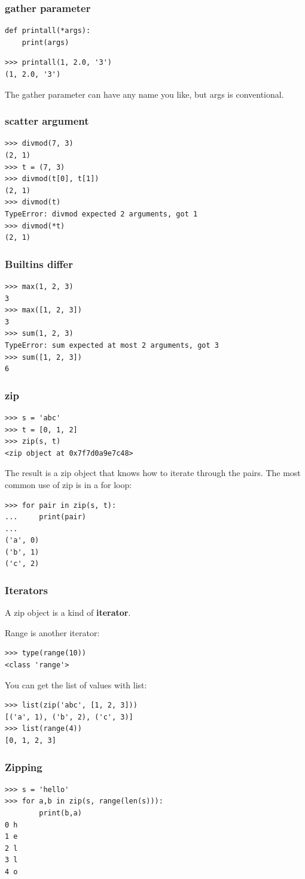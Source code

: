 \documentclass{beamer}
\newcommand{\bfr}[1]{\begin{frame}[fragile]\frametitle{{ #1 }}}
\begin{document}
\bfr{gather parameter}

\begin{lstlisting}
def printall(*args):
    print(args)
\end{lstlisting}
\begin{lstlisting}
>>> printall(1, 2.0, '3')
(1, 2.0, '3')
\end{lstlisting}
The gather parameter can have any name you like, but args is conventional. 
\end{frame}

\bfr{scatter argument}
\begin{lstlisting}
>>> divmod(7, 3)
(2, 1)
>>> t = (7, 3)
>>> divmod(t[0], t[1])
(2, 1)
>>> divmod(t)
TypeError: divmod expected 2 arguments, got 1
>>> divmod(*t)
(2, 1)
\end{lstlisting}
\end{frame}

\bfr{Builtins differ}
\begin{lstlisting}
>>> max(1, 2, 3)
3
>>> max([1, 2, 3])
3
>>> sum(1, 2, 3)
TypeError: sum expected at most 2 arguments, got 3
>>> sum([1, 2, 3])
6
\end{lstlisting}
\end{frame}

\bfr{zip}
\begin{lstlisting}
>>> s = 'abc'
>>> t = [0, 1, 2]
>>> zip(s, t)
<zip object at 0x7f7d0a9e7c48>
\end{lstlisting}
The result is a zip object that knows how to iterate through the pairs. The most common use of zip is in a for loop:
\begin{lstlisting}
>>> for pair in zip(s, t):
...     print(pair)
...
('a', 0)
('b', 1)
('c', 2)
\end{lstlisting}
\end{frame}
\bfr{Iterators}

A zip object is a kind of {\bf iterator}.

Range is another iterator:
\begin{lstlisting}
>>> type(range(10))
<class 'range'>
\end{lstlisting}

You can get the list of values with list:
\begin{lstlisting}
>>> list(zip('abc', [1, 2, 3]))               
[('a', 1), ('b', 2), ('c', 3)]
>>> list(range(4))                
[0, 1, 2, 3]
\end{lstlisting}
\end{frame}


\bfr{Zipping}
\begin{lstlisting}
>>> s = 'hello'           
>>> for a,b in zip(s, range(len(s))):
        print(b,a)           
0 h
1 e
2 l
3 l
4 o
\end{lstlisting}
\end{frame}
\end{document}
